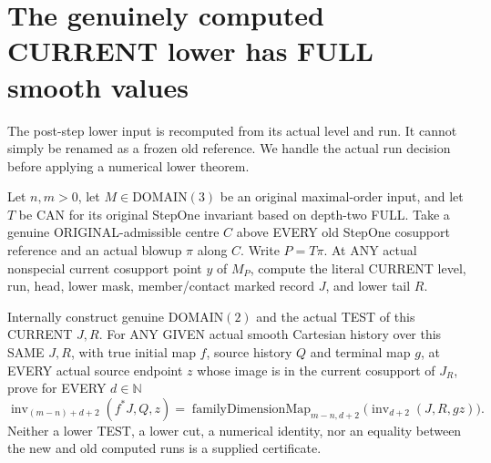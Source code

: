 \section{The genuinely computed CURRENT lower has FULL smooth values}

The post-step lower input is recomputed from its actual level and run.
It cannot simply be renamed as a frozen old reference. We handle the
actual run decision before applying a numerical lower theorem.

\begin{theorem}
\label{hir:original-prepared-current-bound-two-lower-full-smooth-values}
\leanok
Let $n,m>0$, let $M\in\mathrm{DOMAIN}(3)$ be an original maximal-order
input, and let $T$ be CAN for its original StepOne invariant based on
depth-two FULL. Take a genuine ORIGINAL-admissible centre $C$ above
EVERY old StepOne cosupport reference and an actual blowup $\pi$ along
$C$. Write $P=T\pi$. At ANY actual nonspecial current cosupport point
$y$ of $M_P$, compute the literal CURRENT level, run, head, lower mask,
member/contact marked record $J$, and lower tail $R$.

Internally construct genuine DOMAIN$(2)$ and the actual TEST of this
CURRENT $J,R$. For ANY GIVEN actual smooth Cartesian history over
this SAME $J,R$, with true initial map $f$, source history $Q$ and
terminal map $g$, at EVERY actual source endpoint $z$ whose image is
in the current cosupport of $J_R$, prove for EVERY $d\in\mathbb N$
\[
 \operatorname{inv}_{(m-n)+d+2}(f^*J,Q,z)
   =\operatorname{familyDimensionMap}_{m-n,d+2}
     \bigl(\operatorname{inv}_{d+2}(J,R,gz)\bigr).
\]
Neither a lower TEST, a lower cut, a numerical identity, nor an equality
between the new and old computed runs is a supplied certificate.
\end{theorem}
